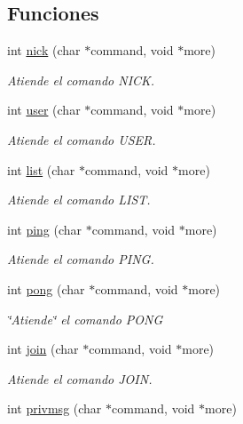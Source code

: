 \subsection*{Funciones}
\begin{DoxyCompactItemize}
\item 
int \hyperlink{G-2301-01-P1-irc_8c_ab60b803c6ebb88356d689183be9d2e34}{nick} (char $\ast$command, void $\ast$more)
\begin{DoxyCompactList}\small\item\em Atiende el comando N\+I\+C\+K. \end{DoxyCompactList}\item 
int \hyperlink{G-2301-01-P1-irc_8c_a199bfa961df8d05a8aa4d9a0737a0c2b}{user} (char $\ast$command, void $\ast$more)
\begin{DoxyCompactList}\small\item\em Atiende el comando U\+S\+E\+R. \end{DoxyCompactList}\item 
int \hyperlink{G-2301-01-P1-irc_8c_ac881ae8dcf7537a78812d39bf22623f5}{list} (char $\ast$command, void $\ast$more)
\begin{DoxyCompactList}\small\item\em Atiende el comando L\+I\+S\+T. \end{DoxyCompactList}\item 
int \hyperlink{G-2301-01-P1-irc_8c_a6cb3c8b40a00e2bdce33b67465868fbb}{ping} (char $\ast$command, void $\ast$more)
\begin{DoxyCompactList}\small\item\em Atiende el comando P\+I\+N\+G. \end{DoxyCompactList}\item 
int \hyperlink{G-2301-01-P1-irc_8c_a77d91916f85b9b3646ae5ac325d823a3}{pong} (char $\ast$command, void $\ast$more)
\begin{DoxyCompactList}\small\item\em \char`\"{}\+Atiende\char`\"{} el comando P\+O\+N\+G \end{DoxyCompactList}\item 
int \hyperlink{G-2301-01-P1-irc_8c_afa23724442e58e093da96c9e15f01100}{join} (char $\ast$command, void $\ast$more)
\begin{DoxyCompactList}\small\item\em Atiende el comando J\+O\+I\+N. \end{DoxyCompactList}\item 
int \hyperlink{G-2301-01-P1-irc_8c_a6aa2fba4850500569d2cead5b33056ea}{privmsg} (char $\ast$command, void $\ast$more)

\end{DoxyCompactItemize}

